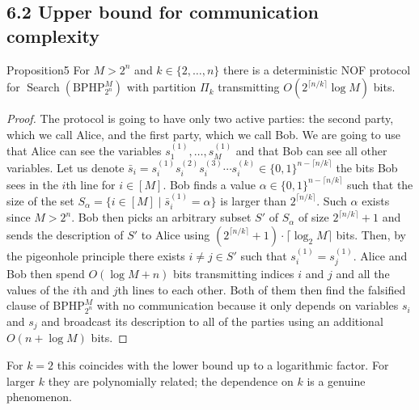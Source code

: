 \subsection*{6.2 Upper bound for communication complexity}
\begin{authorclaim}{Proposition5}
For $M>2^n$ and $k\in\{2,\ldots,n\}$ there is a deterministic NOF protocol for $\operatorname{Search}(\mathrm{BPHP}_{2^n}^M)$ with partition $\Pi_k$ transmitting $O(2^{\lceil n/k\rceil}\log M)$ bits.
\end{authorclaim}
\begin{proof}
The protocol is going to have only two active parties: the second party, which we call Alice, and the first party, which we call Bob. We are going to use that Alice can see the variables $s_1^{(1)},\ldots,s_M^{(1)}$ and that Bob can see all other variables.
Let us denote $\bar s_i=s_i^{(1)}s_i^{(2)}s_i^{(3)}\cdots s_i^{(k)}\in\{0,1\}^{n-\lceil n/k\rceil}$ the bits Bob sees in the $i$th line for $i\in[M]$. Bob finds a value $\alpha\in\{0,1\}^{n-\lceil n/k\rceil}$ such that the size of the set $S_\alpha=\{i\in[M]\mid\bar s_i^{(1)}=\alpha\}$ is larger than $2^{\lceil n/k\rceil}$. Such $\alpha$ exists since $M>2^n$. Bob then picks an arbitrary subset $S'$ of $S_\alpha$ of size $2^{\lceil n/k\rceil}+1$ and sends the description of $S'$ to Alice using $(2^{\lceil n/k\rceil}+1)\cdot\lceil\log_2M\rceil$ bits. Then, by the pigeonhole principle there exists $i\ne j\in S'$ such that $s_i^{(1)}=s_j^{(1)}$. Alice and Bob then spend $O(\log M+n)$ bits transmitting indices $i$ and $j$ and all the values of the $i$th and $j$th lines to each other. Both of them then find the falsified clause of $\mathrm{BPHP}_{2^n}^M$ with no communication because it only depends on variables $s_i$ and $s_j$ and broadcast its description to all of the parties using an additional $O(n+\log M)$ bits.
\end{proof}
For $k=2$ this coincides with the lower bound up to a logarithmic factor. For larger $k$ they are polynomially related; the dependence on $k$ is a genuine phenomenon.
